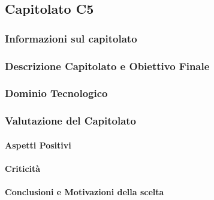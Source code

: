 \subsection{Capitolato C5}

\subsubsection{Informazioni sul capitolato}

\subsubsection{Descrizione Capitolato e Obiettivo Finale}

\subsubsection{Dominio Tecnologico}

\subsubsection{Valutazione del Capitolato}

\paragraph{Aspetti Positivi}

\paragraph{Criticità}

\paragraph{Conclusioni e Motivazioni della scelta}